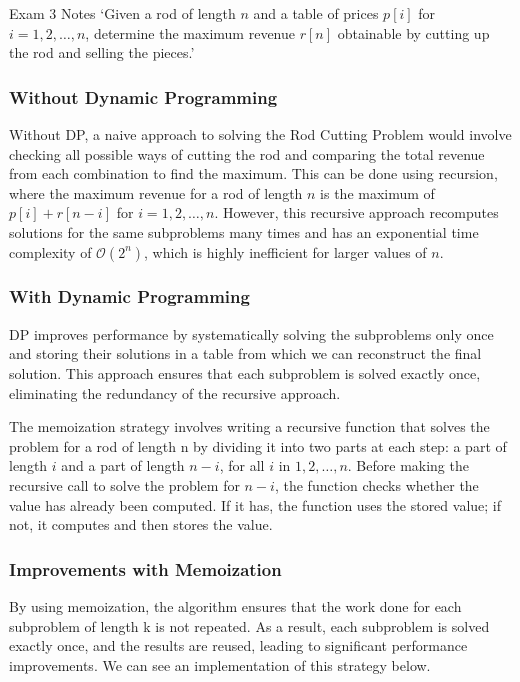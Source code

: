 \begin{examnotes}{Exam 3 Notes}
    `Given a rod of length $n$ and a table of prices $p[i]$ for $i = 1, 2, \dots, n$, determine the maximum revenue $r[n]$ obtainable by cutting up the rod and selling the pieces.'

    \subsubsection*{Without Dynamic Programming}

    Without DP, a naive approach to solving the Rod Cutting Problem would involve checking all possible ways of cutting the rod and comparing the total revenue from each combination to find the maximum. 
    This can be done using recursion, where the maximum revenue for a rod of length $n$ is the maximum of $p[i] + r[n-i]$ for $i = 1, 2, \dots, n$. However, this recursive approach recomputes solutions 
    for the same subproblems many times and has an exponential time complexity of $\mathcal{O}(2^n)$, which is highly inefficient for larger values of $n$.

    \subsubsection*{With Dynamic Programming}

    DP improves performance by systematically solving the subproblems only once and storing their solutions in a table from which we can reconstruct the final solution. This approach ensures that each 
    subproblem is solved exactly once, eliminating the redundancy of the recursive approach.

    The memoization strategy involves writing a recursive function that solves the problem for a rod of length n by dividing it into two parts at each step: a part of length $i$ and a part of length $n-i$, 
    for all $i$ in $1, 2, \dots, n$. Before making the recursive call to solve the problem for $n-i$, the function checks whether the value has already been computed. If it has, the function uses the 
    stored value; if not, it computes and then stores the value.

    \begin{highlight}
        \subsubsection*{Improvements with Memoization}

        By using memoization, the algorithm ensures that the work done for each subproblem of length k is not repeated. As a result, each subproblem is solved exactly once, and the results are reused, 
        leading to significant performance improvements. We can see an implementation of this strategy below.


\end{highlight}
\end{examnotes}
